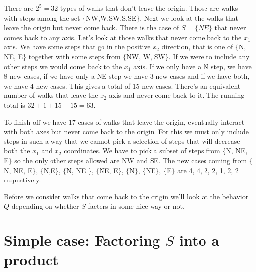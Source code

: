 There are $2^5 = 32$ types of walks that don't leave the origin. Those are walks with steps among the set $\{$NW,W,SW,S,SE$\}$. Next we look at the walks that leave the origin but never come back.  There is the case of $S = \{NE\}$ that never comes back to any axis. Let's look at those walks that never come back to the $x_1$ axis. We have some steps that go in the positive $x_2$ direction, that is one of $\{$N, NE, E$\}$ together with some steps from $\{$NW, W, SW$\}$. If we were to include any other steps we would come back to the $x_1$ axis. If we only have a N step, we have 8 new cases, if we have only a NE step we have 3 new cases and if we have both, we have 4 new cases. This gives a total of 15 new cases. There's an equivalent number of walks that leave the $x_2$ axis and never come back to it. The running total is $32 + 1  + 15 + 15 = 63$.

To finish off we have 17 cases of walks that leave the origin, eventually interact with both axes but never come back to the origin. For this we must only include steps in such a way that we cannot pick a selection of steps that will decrease both the $x_1$ and $x_2$ coordinates. We have to pick a subset of steps from $\{$N, NE, E$\}$ so the only other steps allowed are NW and SE. The new cases coming from $\{$N, NE, E$\}$, $\{$N,E$\}$, $\{$N, NE $\}$, $\{$NE, E$\}$, $\{$N$\}$, $\{$NE$\}$, $\{$E$\}$ are 4, 4, 2, 2, 1, 2, 2 respectively.

Before we consider walks that come back to the origin we'll look at the behavior $Q$ depending on whether $S$ factors in some nice way or not.

\section{Simple case: Factoring $S$ into a product}


